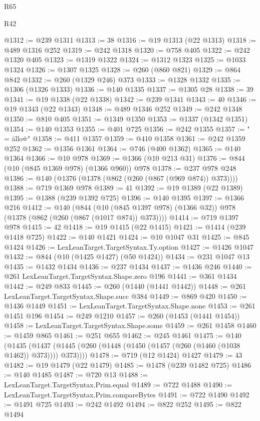 \begin{lexlean}{R65}
\begin{lexlean}{R42}
\begin{coremodule}
{{{{{{{{{{{{{{{{{{{{{{{{{{{{{{{{{{{{{{{{{{{{{{{{{{{{{{{{{{{{{{{{{{{{{{{{{{{{{{{{{{{{{{{{{{{{{{{{{{{{{{{{{{{{{{{{{{{{{{{{{{{{{{{{{{{{{{{{{{{{{{{{{{{{{{{{{{{{{{{{{{{{{{{{{{{{{{{{{{{{{{{@1312 := @239 @1311
@1313 := 38
@1316 := @19 @1313 (@22 @1313)
@1318 := @489 @1316 @252
@1319 := @242 @1318
@1320 := @758 @405
@1322 := @242 @1320 @405
@1323 := @1319 @1322
@1324 := @1312 @1323
@1325 := @1033 @1324
@1326 := @1307 @1325
@1328 := @260 (@860 @821)
@1329 := @864 @842
@1332 := @260 (@1329 @246) @373
@1333 := @1328 @1332
@1335 := @1306 (@1326 @1333)
@1336 := @140 @1335
@1337 := @1305 @28
@1338 := 39
@1341 := @19 @1338 (@22 @1338)
@1342 := @239 @1341
@1343 := 40
@1346 := @19 @1343 (@22 @1343)
@1348 := @489 @1346 @252
@1349 := @242 @1348
@1350 := @810 @405
@1351 := @1349 @1350
@1353 := @1337 (@1342 @1351)
@1354 := @140 @1353
@1355 := @401 @725
@1356 := @242 @1355
@1357 := " = \"allow\"\n"
@1358 := @411 @1357
@1359 := @410 @1358
@1361 := @242 @1359 @252
@1362 := @1356 @1361
@1364 := @746 (@400 @1362)
@1365 := @140 @1364
@1366 := @10 @978
@1369 := @1366 (@10 @213 @31)
@1376 := @844 (@10 (@845 @1369 @978) (@1366 @960)) @978
@1378 := @237 @978 @248
@1386 := @140 (@1376 (@1378 (@862 (@260 (@867 (@969 @874)) @373))))
@1388 := @719 @1369 @978
@1389 := 41
@1392 := @19 @1389 (@22 @1389)
@1395 := @1388 (@239 @1392 @725)
@1396 := @140 @1395
@1397 := @1366 @216
@1412 := @140
    (@844 (@10 (@845 @1397 @978) (@1366 @32)) @978 (@1378 (@862 (@260 (@867 (@1017 @874)) @373))))
@1414 := @719 @1397 @978
@1415 := 42
@1418 := @19 @1415 (@22 @1415)
@1421 := @1414 (@239 @1418 @725)
@1422 := @140 @1421
@1424 := @10 @1047 @31
@1425 := @845 @1424
@1426 := LexLeanTarget.TargetSyntax.Ty.option
@1427 := @1426 @1047
@1432 := @844 (@10 (@1425 @1427) (@50 @1424))
@1434 := @231 @1047 @13
@1435 := @1432 @1434
@1436 := @237 @1434
@1437 := @1436 @246
@1440 := @261 LexLeanTarget.TargetSyntax.Shape.zero @196
@1441 := @361 @1434
@1442 := @249 @833
@1445 := @260 (@1440 (@1441 @1442))
@1448 := @261 LexLeanTarget.TargetSyntax.Shape.succ @384
@1449 := @869 @420
@1450 := @1436 @1449
@1451 := LexLeanTarget.TargetSyntax.Shape.none
@1453 := @261 @1451 @196
@1454 := @249 @1210
@1457 := @260 (@1453 (@1441 @1454))
@1458 := LexLeanTarget.TargetSyntax.Shape.some
@1459 := @261 @1458
@1460 := @1459 @865
@1461 := @251 @655
@1462 := @245 @1461
@1475 := @140
    (@1435 (@1437 (@1445 (@260 (@1448 (@1450 (@1457 (@260 (@1460 (@1038 @1462)) @373)))) @373))))
@1478 := @719 (@12 @1424) @1427
@1479 := 43
@1482 := @19 @1479 (@22 @1479)
@1485 := @1478 (@239 @1482 @725)
@1486 := @140 @1485
@1487 := @720 @13
@1488 := LexLeanTarget.TargetSyntax.Prim.equal
@1489 := @722 @1488
@1490 := LexLeanTarget.TargetSyntax.Prim.compareBytes
@1491 := @722 @1490
@1492 := @1491 @725
@1493 := @242 @1492
@1494 := @822 @252
@1495 := @822 @1494
}}}}}}}}}}}}}}}}}}}}}}}}}}}}}}}}}}}}}}}}}}}}}}}}}}}}}}}}}}}}}}}}}}}}}}}}}}}}}}}}}}}}}}}}}}}}}}}}}}}}}}}}}}}}}}}}}}}}}}}}}}}}}}}}}}}}}}}}}}}}}}}}}}}}}}}}}}}}}}}}}}}}}}}}}}}}}}}}}}}}}}}
\end{coremodule}
\end{lexlean}
\end{lexlean}
